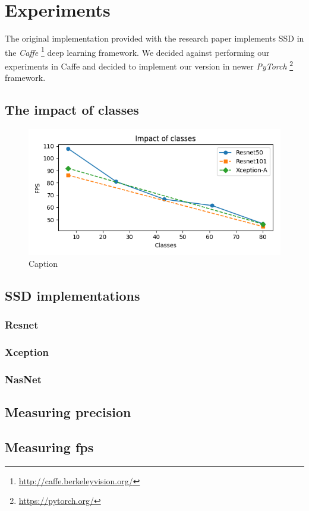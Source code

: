 \chapter{Experiments}

The original implementation provided with the research paper implements SSD in the \textit{Caffe} \footnote{\url{http://caffe.berkeleyvision.org/}} deep learning framework. We decided against performing our experiments in Caffe and decided to implement our version in newer \textit{PyTorch} \footnote{\url{https://pytorch.org/}} framework. 



\section{The impact of classes}
\begin{figure}
    \centering
    \includegraphics[width=\textwidth]{img/fps_class}
    \caption{Caption}
    \label{fig:fpscls}
\end{figure}

\section{SSD implementations}
\subsection{Resnet}
\subsection{Xception}
\subsection{NasNet}

\section{Measuring precision}

\section{Measuring fps}